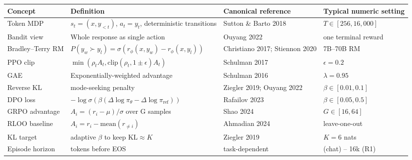 {\def\LTcaptype{none} %
\begin{longtable}[]{@{}
  >{\raggedright\arraybackslash}p{}
  >{\raggedright\arraybackslash}p{}
  >{\raggedright\arraybackslash}p{}
  >{\raggedright\arraybackslash}p{}@{}}
\toprule\noalign{}
\begin{minipage}[b]{\linewidth}\raggedright
Concept
\end{minipage} & \begin{minipage}[b]{\linewidth}\raggedright
Definition
\end{minipage} & \begin{minipage}[b]{\linewidth}\raggedright
Canonical reference
\end{minipage} & \begin{minipage}[b]{\linewidth}\raggedright
Typical numeric setting
\end{minipage} \\
\midrule\noalign{}
\endhead
\bottomrule\noalign{}
\endlastfoot
Token MDP & \(s_t = (x, y_{<t})\), \(a_t = y_t\), deterministic transitions & Sutton \& Barto 2018 & \(T \in [256, 16{,}000]\) \\
Bandit view & Whole response as single action & Ouyang 2022 & one terminal reward \\
Bradley--Terry RM & \(P(y_w \succ y_l) = \sigma(r_\phi(x, y_w) - r_\phi(x, y_l))\) & Christiano 2017; Stiennon 2020 & 7B--70B RM \\
PPO clip & \(\min(\rho_t A_t, \mathrm{clip}(\rho_t, 1\pm\epsilon)A_t)\) & Schulman 2017 & \(\epsilon = 0.2\) \\
GAE & Exponentially-weighted advantage & Schulman 2016 & \(\lambda = 0.95\) \\
Reverse KL & mode-seeking penalty & Ziegler 2019; Ouyang 2022 & \(\beta \in [0.01, 0.1]\) \\
DPO loss & \(-\log \sigma(\beta(\Delta\log\pi_\theta - \Delta\log\pi_{\text{ref}}))\) & Rafailov 2023 & \(\beta \in [0.05, 0.5]\) \\
GRPO advantage & \(A_i = (r_i - \mu)/\sigma\) over G samples & Shao 2024 & \(G \in [16, 64]\) \\
RLOO baseline & \(A_i = r_i - \mathrm{mean}(r_{\neq i})\) & Ahmadian 2024 & leave-one-out \\
KL target & adaptive \(\beta\) to keep \(\mathrm{KL} \approx K\) & Ziegler 2019 & \(K = 6\) nats \\
Episode horizon & tokens before EOS & task-dependent & 256 (chat) -- 16k (R1) \\
\end{longtable}
}

